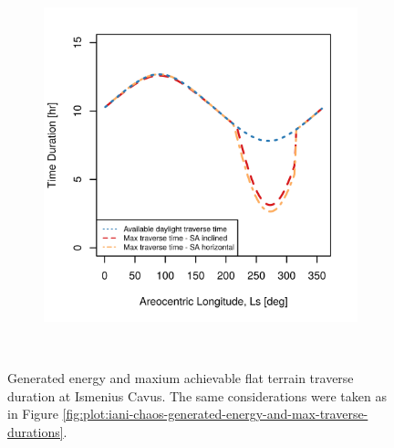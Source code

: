 \begin{figure}[h]
\begin{subfigure}[t]{\subfigureWidth}
        \includegraphics[height=\graphicsHeight]{sections/design/solar-array/plots/ismeniuscavus-75w-max-traverse-durations.png}
		\label{fig:plot:sub:ismenius-cavus-max-traverse-durations}
	\end{subfigure}\\[0.8ex]
    \caption[Generated energy and maxium achievable flat terrain traverse durations at Ismenius Cavus]
            {Generated energy and maxium achievable flat terrain traverse duration at Ismenius Cavus. The same considerations were taken as in Figure \ref{fig:plot:iani-chaos-generated-energy-and-max-traverse-durations}.}
    \label{fig:plot:ismenius-cavus-generated-energy-and-max-traverse-durations}
\vspace{-2ex}
\end{figure}

